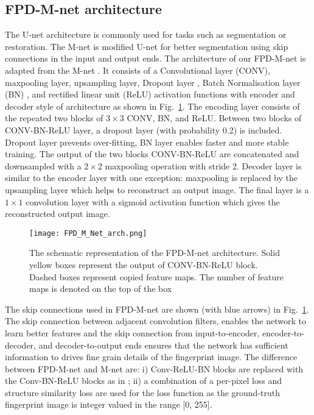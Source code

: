 \documentclass{llncs}
\begin{document}
\subsection{FPD-M-net architecture}
\label{ssec:arch}
The U-net \cite{ronneberger2015u} architecture is commonly used for tasks such as segmentation or restoration. The M-net is modified U-net for better segmentation using skip connections in the input and output ends. The architecture of our FPD-M-net is adapted from the M-net \cite{mehta2017m}. It consists of a Convolutional layer (CONV), maxpooling layer, upsampling layer, Dropout layer \cite{srivastava2014dropout}, Batch Normalisation layer (BN) \cite{ioffe2015batch}, and rectified linear unit (ReLU) activation functions with encoder and decoder style of architecture as shown in Fig.~\ref{fig:FPD-M-net}. The encoding layer consists of the repeated two blocks of $3 \times 3$ CONV, BN, and ReLU. Between two blocks of CONV-BN-ReLU layer, a dropout layer (with probability 0.2) is included. Dropout layer prevents over-fitting, BN layer enables faster and more stable training. The output of the two blocks CONV-BN-ReLU are concatenated and downsampled with a $2 \times 2$ maxpooling operation with stride 2. Decoder layer is similar to the encoder layer with one exception: maxpooling is replaced by the upsampling layer which helps to reconstruct an output image. The final layer is a $1 \times 1$ convolution layer with a sigmoid activation function which gives the reconstructed output image.

\begin{figure}[t]
    \centering
    \texttt{[image: FPD\_M\_Net\_arch.png]}
    \caption{The schematic representation of the FPD-M-net architecture. Solid yellow boxes represent the output of CONV-BN-ReLU block. Dashed boxes represent copied feature maps. The number of feature maps is denoted on the top of the box}
    \label{fig:FPD-M-net}
\end{figure}

The skip connections used in FPD-M-net are shown (with blue arrows) in Fig.~\ref{fig:FPD-M-net}. The skip connection between adjacent convolution filters, enables the network to learn better features \cite{srivastava2015highway} and the skip connection from input-to-encoder, encoder-to-decoder, and decoder-to-output ends ensures that the network has sufficient information to drives fine grain details of the fingerprint image. The difference between FPD-M-net and M-net are: i) Conv-ReLU-BN blocks are replaced with the Conv-BN-ReLU blocks as in \cite{ioffe2015batch}; ii) a combination of a per-pixel loss and structure similarity loss are used for the loss function as the ground-truth fingerprint image is integer valued in the range [0, 255].
\end{document}
